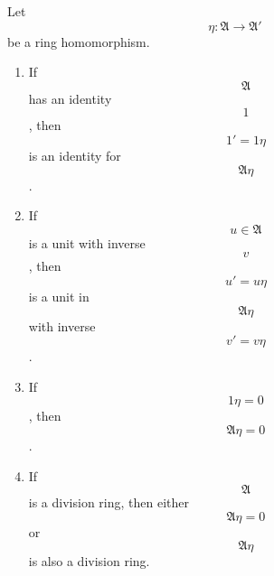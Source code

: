 Let $$\eta: \mathfrak{A} \to \mathfrak{A}'$$ be a ring homomorphism.

\begin{enumerate}
\item If $$\mathfrak{A}$$ has an identity $$1$$, then $$1' = 1\eta$$ is an identity for $$\mathfrak{A}\eta$$.
\item If $$u \in \mathfrak{A}$$ is a unit with inverse $$v$$, then $$u' = u\eta$$ is a unit in $$\mathfrak{A}\eta$$ with inverse $$v' = v\eta$$.
\item If $$1\eta = 0$$, then $$\mathfrak{A}\eta = 0$$.
\item If $$\mathfrak{A}$$ is a division ring, then either $$\mathfrak{A}\eta = 0$$ or $$\mathfrak{A}\eta$$ is also a division ring.
\end{enumerate}

